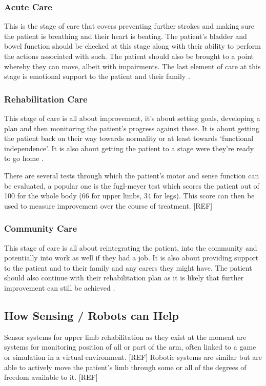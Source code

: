 \documentclass[journal]{IEEEtran}
\begin{document}
\subsubsection{Acute Care}
This is the stage of care that covers preventing further strokes and making sure the 
patient is breathing and their heart is beating. The patient's bladder and bowel 
function should be checked at this stage along with their ability to perform the 
actions associated with such. The patient should also be brought to a point 
whereby they can move, albeit with impairments. The last element of care at 
this stage is emotional support to the patient and their family \cite{Physio}.

\subsubsection{Rehabilitation Care}
This stage of care is all about improvement, it's about setting goals, developing a plan 
and then monitoring the patient's progress against these. It is about getting the patient 
back on their way towards normality or at least towards `functional independence'. It is 
also about getting the patient to a stage were they're ready to go home \cite{Physio}.

There are several tests through which the patient's motor and sense function 
can be evaluated, a popular one is the fugl-meyer test which scores the patient 
out of 100 for the whole body (66 for upper limbs, 34 for legs). This score can 
then be used to measure improvement over the course of treatment. [REF]

\subsubsection{Community Care}
This stage of care is all about reintegrating the patient, into the community and potentially 
into work as well if they had a job. It is also about providing support to the patient and 
to their family and any carers they might have. The patient should also continue with 
their rehabilitation plan as it is likely that further improvement can still be achieved \cite{Physio}.

\subsection{How Sensing / Robots can Help}
Sensor systems for upper limb rehabilitation as they exist at the moment are systems for monitoring 
position of all or part of the arm, often linked to a game or simulation in a virtual environment. [REF]
Robotic systems are similar but are able to actively move the patient's limb through some or all 
of the degrees of freedom available to it. [REF]
\end{document}
